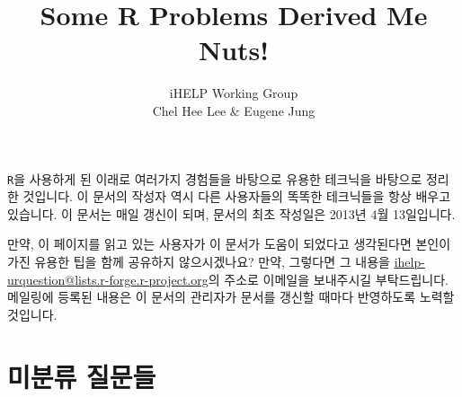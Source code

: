 \documentclass{article}
\title{Some R Problems Derived Me Nuts!}
\author{iHELP Working Group \\ Chel Hee Lee \& Eugene Jung}
\begin{document}
\maketitle

\texttt{R}을 사용하게 된 이래로 여러가지 경험들을 바탕으로 유용한 테크닉을 바탕으로 정리한 것입니다.
이 문서의 작성자 역시 다른 사용자들의 똑똑한 테크닉들을 항상 배우고 있습니다.
이 문서는 매일 갱신이 되며, 문서의 최초 작성일은 2013년 4월 13일입니다.

만약, 이 페이지를 읽고 있는 사용자가 이 문서가 도움이 되었다고 생각된다면 본인이 가진 유용한 팁을 함께 공유하지 않으시겠나요?  만약, 그렇다면 그 내용을 \href{mailto:ihelp-urquestion@lists.r-forge.r-project.org}{ihelp-urquestion@lists.r-forge.r-project.org}의 주소로 이메일을 보내주시길 부탁드립니다. 
메일링에 등록된 내용은 이 문서의 관리자가 문서를 갱신할 때마다 반영하도록 노력할 것입니다.



%
%

\section{미분류 질문들}




\end{document}
